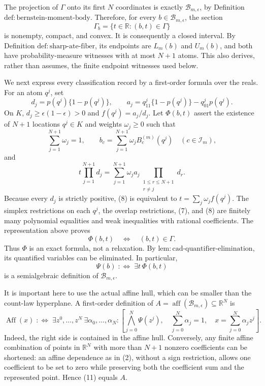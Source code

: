 The projection of \(\Gamma\) onto its first \(N\) coordinates is exactly \(\mathcal B_{m,\epsilon}\), by Definition \(\mathrm{def{:}bernstein\text{-}moment\text{-}body}\).  Therefore, for every \(b\in\mathcal B_{m,\epsilon}\), the section
\[
\Gamma_b=\{t\in\mathbb R:(b,t)\in\Gamma\}
\tag{5}
\]
is nonempty, compact, and convex.  It is consequently a closed interval.  By Definition \(\mathrm{def{:}sharp\text{-}ate\text{-}fiber}\), its endpoints are \(L_m(b)\) and \(U_m(b)\), and both have probability-measure witnesses with at most \(N+1\) atoms.  This also derives, rather than assumes, the finite endpoint witnesses used below.

We next express every classification record by a first-order formula over the reals.  For an atom \(q^j\), set
\[
d_j=p(q^j)\{1-p(q^j)\},
\qquad
a_j=q^j_{11}\{1-p(q^j)\}-q^j_{01}p(q^j).
\tag{6}
\]
On \(K\), \(d_j\geq\epsilon(1-\epsilon)>0\) and \(f(q^j)=a_j/d_j\).  Let \(\Phi(b,t)\) assert the existence of \(N+1\) locations \(q^j\in K\) and weights \(\omega_j\geq0\) such that
\[
\sum_{j=1}^{N+1}\omega_j=1,
\qquad
b_c=\sum_{j=1}^{N+1}\omega_jB_c^{(m)}(q^j)\quad(c\in\mathcal I_m),
\tag{7}
\]
and
\[
t\prod_{j=1}^{N+1}d_j
=
\sum_{j=1}^{N+1}\omega_ja_j\prod_{\substack{1\leq r\leq N+1\\r\neq j}}d_r.
\tag{8}
\]
Because every \(d_j\) is strictly positive, (8) is equivalent to \(t=\sum_j\omega_jf(q^j)\).  The simplex restrictions on each \(q^j\), the overlap restrictions, (7), and (8) are finitely many polynomial equalities and weak inequalities with rational coefficients.  The representation above proves
\[
\Phi(b,t)\quad\Longleftrightarrow\quad(b,t)\in\Gamma.
\tag{9}
\]
Thus \(\Phi\) is an exact formula, not a relaxation.  By \(\mathrm{lem{:}cad\text{-}quantifier\text{-}elimination}\), its quantified variables can be eliminated.  In particular,
\[
\Psi(b)\;:\Longleftrightarrow\;\exists t\,\Phi(b,t)
\tag{10}
\]
is a semialgebraic definition of \(\mathcal B_{m,\epsilon}\).

It is important here to use the actual affine hull, which can be smaller than the count-law hyperplane.  A first-order definition of \(A=\operatorname{aff}(\mathcal B_{m,\epsilon})\subseteq\mathbb R^N\) is
\[
\operatorname{Aff}(x)\;:\Longleftrightarrow\;
\exists z^0,\ldots,z^N\ \exists\alpha_0,\ldots,\alpha_N:
\left[
\bigwedge_{j=0}^N\Psi(z^j),\quad
\sum_{j=0}^N\alpha_j=1,\quad
x=\sum_{j=0}^N\alpha_jz^j
\right].
\tag{11}
\]
Indeed, the right side is contained in the affine hull.  Conversely, any finite affine combination of points in \(\mathbb R^N\) with more than \(N+1\) nonzero coefficients can be shortened: an affine dependence as in (2), without a sign restriction, allows one coefficient to be set to zero while preserving both the coefficient sum and the represented point.  Hence (11) equals \(A\).

